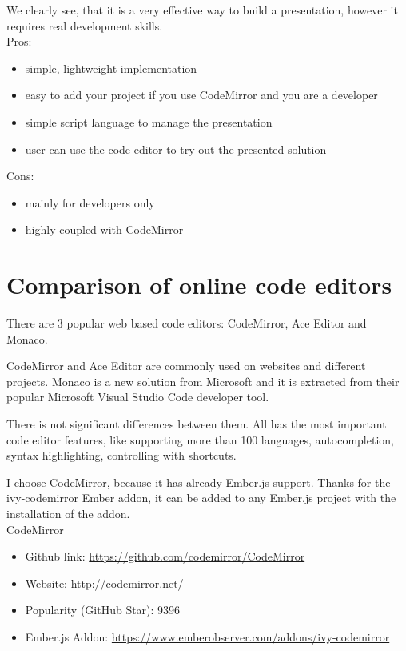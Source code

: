 \documentclass[11pt
              , a4paper
              , twoside
              , openright
              ]{report}
\begin{document}
We clearly see, that it is a very effective way to build a presentation, however it requires real development skills.\\

\noindent Pros:
\begin{itemize}[noitemsep]
\item simple, lightweight implementation
\item easy to add your project if you use CodeMirror and you are a developer
\item simple script language to manage the presentation
\item user can use the code editor to try out the presented solution
\end{itemize}
Cons:
\begin{itemize}[noitemsep]
\item mainly for developers only
\item highly coupled with CodeMirror
\end{itemize}


\section{Comparison of online code editors}

There are 3 popular web based code editors: CodeMirror, Ace Editor and Monaco.

CodeMirror and Ace Editor are commonly used on websites and different projects. Monaco is a new solution from Microsoft and it is extracted from their popular Microsoft Visual Studio Code developer tool.

There is not significant differences between them. All has the most important code editor features, like supporting more than 100 languages, autocompletion, syntax highlighting, controlling with shortcuts.

I choose CodeMirror, because it has already Ember.js support. Thanks for the ivy-codemirror Ember addon, it can be added to any Ember.js project with the installation of the addon. \\

\noindent CodeMirror
\begin{itemize}[noitemsep]
\item Github link: \url{https://github.com/codemirror/CodeMirror}
\item Website: \url{http://codemirror.net/}
\item Popularity (GitHub Star): 9396
\item Ember.js Addon: \url{https://www.emberobserver.com/addons/ivy-codemirror} \\
\end{itemize}
\end{document}
